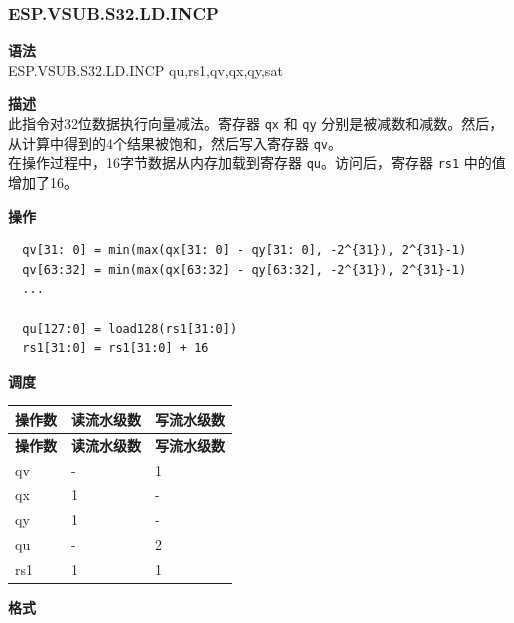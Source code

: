 \newpage

\newpage
\subsubsection{ESP.VSUB.S32.LD.INCP}\label{instruction:ESPVSUBS32LDINCP}
\textbf{语法}\\
ESP.VSUB.S32.LD.INCP qu,rs1,qv,qx,qy,sat

\textbf{描述}\\
此指令对32位数据执行向量减法。寄存器 \lstinline{qx} 和 \lstinline{qy} 分别是被减数和减数。然后，从计算中得到的4个结果被饱和，然后写入寄存器 \lstinline{qv}。\\ 在操作过程中，16字节数据从内存加载到寄存器 \lstinline{qu}。访问后，寄存器 \lstinline{rs1} 中的值增加了16。

\textbf{操作}\\
\begin{lstlisting}
  qv[31: 0] = min(max(qx[31: 0] - qy[31: 0], -2^{31}), 2^{31}-1)
  qv[63:32] = min(max(qx[63:32] - qy[63:32], -2^{31}), 2^{31}-1)
  ...

  qu[127:0] = load128(rs1[31:0])
  rs1[31:0] = rs1[31:0] + 16
\end{lstlisting}


\textbf{调度}\\
\begin{longtable}[c]{|l|l|l|}
    \hline
    \rowcolor{lightgray}
    \textbf{操作数} & \textbf{读流水级数} & \textbf{写流水级数} \\\hline
    \endfirsthead
    \hline
    \rowcolor{lightgray}
     \textbf{操作数} & \textbf{读流水级数} & \textbf{写流水级数} \\\hline
    \endhead
    \hline
    \endfoot

  qv & - & 1 \\\hline
    qx & 1 & - \\\hline
    qy & 1 & - \\\hline
    qu & - & 2 \\\hline
    rs1 & 1 & 1

\end{longtable}

\textbf{格式}\\

